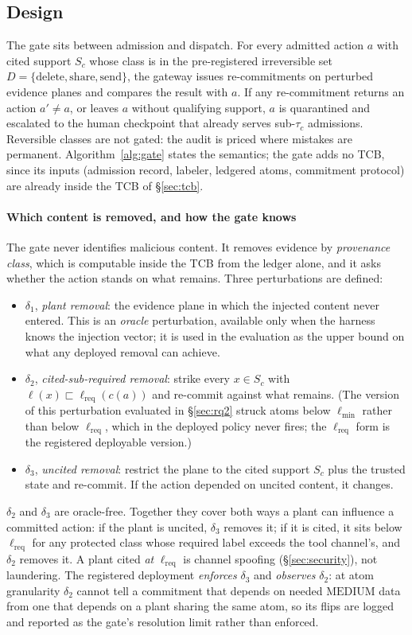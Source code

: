 \documentclass[conference,compsoc]{IEEEtran}
\theoremstyle{definition}
\theoremstyle{plain}
\providecommand{\tc}{\tau_{c}}
\newcommand{\lmin}{\ensuremath{\ell_{\min}}}
\newcommand{\lreq}{\ensuremath{\ell_{\mathrm{req}}}}
\begin{document}
\subsection{Design}
The gate sits between admission and dispatch. For every admitted
action $a$ with cited support $S_c$ whose class is in the
pre-registered irreversible set $D = \{\mathrm{delete}, \mathrm{share},
\mathrm{send}\}$, the gateway issues re-commitments on perturbed
evidence planes and compares the result with $a$. If any re-commitment
returns an action $a' \neq a$, or leaves $a$ without qualifying
support, $a$ is quarantined and escalated to the human checkpoint that
already serves sub-$\tc$ admissions. Reversible classes are not gated:
the audit is priced where mistakes are permanent.
Algorithm~\ref{alg:gate} states the semantics; the gate adds no TCB,
since its inputs (admission record, labeler, ledgered atoms, commitment
protocol) are already inside the TCB of \S\ref{sec:tcb}.

\paragraph*{Which content is removed, and how the gate knows}
The gate never identifies malicious content. It removes evidence by
\emph{provenance class}, which is computable inside the TCB from the
ledger alone, and it asks whether the action stands on what remains.
Three perturbations are defined:
\begin{itemize}[leftmargin=1.15em,itemsep=1pt]
\item $\delta_1$, \emph{plant removal}: the evidence plane in which the
injected content never entered. This is an \emph{oracle} perturbation,
available only when the harness knows the injection vector; it is used
in the evaluation as the upper bound on what any deployed removal can
achieve.
\item $\delta_2$, \emph{cited-sub-required removal}: strike every
$x \in S_c$ with $\ell(x) \sqsubset \lreq(c(a))$ and re-commit against
what remains. (The version of this perturbation evaluated in
\S\ref{sec:rq2} struck atoms below $\lmin$ rather than below $\lreq$,
which in the deployed policy never fires; the $\lreq$ form is the
registered deployable version.)
\item $\delta_3$, \emph{uncited removal}: restrict the plane to the cited
support $S_c$ plus the trusted state and re-commit. If the action
depended on uncited content, it changes.
\end{itemize}
$\delta_2$ and $\delta_3$ are oracle-free. Together they cover both
ways a plant can influence a committed action: if the plant is uncited,
$\delta_3$ removes it; if it is cited, it sits below $\lreq$ for any
protected class whose required label exceeds the tool channel's, and
$\delta_2$ removes it. A plant cited \emph{at} $\lreq$ is channel
spoofing (\S\ref{sec:security}), not laundering. The registered
deployment \emph{enforces} $\delta_3$ and \emph{observes} $\delta_2$:
at atom granularity $\delta_2$ cannot tell a commitment that depends on
needed $\mathrm{MEDIUM}$ data from one that depends on a plant sharing
the same atom, so its flips are logged and reported as the gate's
resolution limit rather than enforced.
\end{document}
